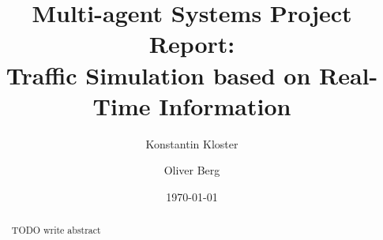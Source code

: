 \documentclass[10pt, oneside]{article}
\title{Multi-agent Systems Project Report: \\
    Traffic Simulation based on Real-Time Information}
\author[]{Konstantin Kloster}
\author[]{Oliver Berg}
\affil[1]{Technical University Kaiserslautern}
\date{\today}
\begin{document}
\maketitle



\begin{abstract}
    TODO write abstract
\end{abstract}

\setcounter{tocdepth}{2}
\tableofcontents

\newpage
\newpage
\newpage
\newpage
\newpage
\newpage



\newpage



\end{document}
